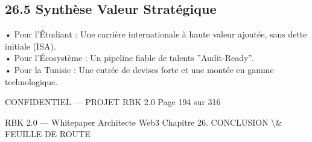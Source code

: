 \documentclass[12pt,landscape,a4paper]{article}
\newenvironment{confidential}
{\begin{tcolorbox}[
    colback=rbkred!5!white,
    colframe=rbkred!75!black,
    title=CONFIDENTIEL,
    fonttitle=\bfseries\color{white},
    coltitle=rbkred!75!black,
    breakable,
    enhanced,
    frame hidden,
    borderline west={2pt}{0pt}{rbkred!75!black}
]}
{\end{tcolorbox}}
\begin{document}
\subsection{26.5 Synthèse Valeur Stratégique}
• Pour l’Étudiant : Une carrière internationale à haute valeur ajoutée, sans dette initiale (ISA).\\
\vspace{0.5em}
• Pour l’Écosystème : Un pipeline fiable de talents ”Audit-Ready”.\\
\vspace{0.5em}
• Pour la Tunisie : Une entrée de devises forte et une montée en gamme technologique.\\
\vspace{0.5em}
\vspace{0.5em}
\vspace{0.5em}
\begin{confidential}CONFIDENTIEL — PROJET RBK 2.0                                Page 194 sur 316\end{confidential}
RBK 2.0 — Whitepaper Architecte Web3                                                      Chapitre 26. CONCLUSION \textbackslash{}& FEUILLE DE ROUTE\\
\vspace{0.5em}
\vspace{0.5em}
\vspace{0.5em}
\end{document}
